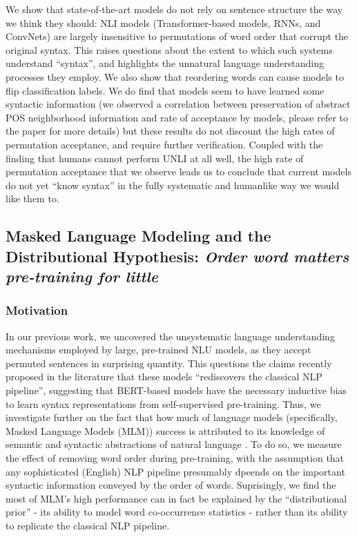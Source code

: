 \documentclass[12pt]{article}
\begin{document}
We show that state-of-the-art models do not rely on sentence structure the way we think they should: NLI models (Transformer-based models, RNNs, and ConvNets) are largely insensitive to permutations of word order that corrupt the original syntax. This raises questions about the extent to which such systems understand ``syntax'', and highlights the unnatural language understanding processes they employ.
We also show that reordering words can cause models to flip classification labels. %
We do find that models seem to have learned some syntactic information (we observed a correlation between preservation of abstract POS neighborhood information and rate of acceptance by models, please refer to the paper for more details) but these results do not discount the high rates of permutation acceptance, and require further verification. Coupled with the finding that humans cannot perform UNLI at all well, the high rate of permutation acceptance that we observe leads us to conclude that current models do not yet ``know syntax'' in the fully systematic and humanlike way we would like them to.


\subsection{Masked Language Modeling and the Distributional Hypothesis: \textit{Order word matters pre-training for little}}

\subsubsection{Motivation}

In our previous work, we uncovered the unsystematic language understanding mechanisms employed by large, pre-trained NLU models, as they accept permuted sentences in surprising quantity. This questions the claims recently proposed in the literature that these models ``rediscovers the classical NLP pipeline'', suggesting that BERT-based models have the necessary inductive bias to learn syntax representations from self-supervised pre-training. Thus, we investigate further on the fact that how much of language models (specifically, Masked Language Models (MLM)) success is attributed to its knowledge of semantic and syntactic abstractions of natural language \cite{sinha2021a}. To do so, we measure the effect of removing word order during pre-training, with the assumption that any sophisticated (English) NLP pipeline presumably dpeends on the important syntactic information conveyed by the order of words. Suprisingly, we find the most of MLM's high performance can in fact be explained by the ``distributional prior'' - its ability to model word co-occurrence statistics - rather than its ability to replicate the classical NLP pipeline.
\end{document}

